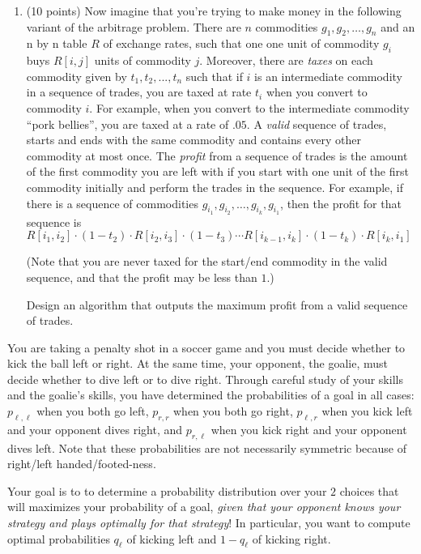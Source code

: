 \documentclass[11pt]{article}
\begin{document}
\begin{enumerate}
\begin{enumerate}
\item (10 points) Now imagine that you're trying to make money in the following variant of the arbitrage problem.  There are $n$ commodities $g_{1}, g_{2}, \ldots, g_{n}$ and an n by n table $R$ of exchange rates, such that one one unit of commodity $g_{i}$ buys $R[i,j]$ units of commodity $j$.  Moreover, there are \emph{taxes} on each commodity given by $t_{1}, t_{2}, ..., t_{n}$ such that if $i$ is an intermediate commodity in a sequence of trades, you are taxed at rate $t_{i}$ when you convert to commodity $i$.  For example, when you convert to the intermediate commodity ``pork bellies'', you are taxed at a rate of $.05$.  A \emph{valid} sequence of trades, starts and ends with the same commodity and contains every other commodity at most once.   The \emph{profit} from a sequence of trades is the amount of the first commodity you are left with if you start with one unit of the first commodity initially and perform the trades in the sequence.  For example, if there is a sequence of commodities $g_{i_{1}}, g_{i_{2}}, \ldots, g_{i_{k}}, g_{i_{1}}$, then the profit for that sequence is\\ $R[i_{1},i_{2}]\cdot (1 - t_{2}) \cdot R[i_{2}, i_{3}] \cdot(1 -  t_{3}) \cdots R[i_{k-1},i_{k}] \cdot (1- t_{k}) \cdot R[i_{k},i_{1}]$

(Note that you are never taxed for the start/end commodity in the valid sequence, and that the profit may be less than $1$.)

Design an algorithm that outputs the maximum profit from a valid sequence of trades.

\end{enumerate}

\extrapage


You are taking a penalty shot in a soccer game and you must decide whether to kick the ball left or right.  At the same time, your opponent, the goalie, must decide whether to dive left or to dive right.  Through careful study of your skills and the goalie's skills, you have determined the probabilities of a goal in all cases: $p_{\ell,\ell}$ when you both go left, $p_{r,r}$ when you both go right, $p_{\ell,r}$ when you kick left and your opponent dives right, and $p_{r,\ell}$ when you kick right and your opponent dives left.  Note that these probabilities are not necessarily symmetric because of right/left handed/footed-ness.

Your goal is to to determine a probability distribution over your $2$ choices that will maximizes your probability of a goal,  \emph{given that your opponent knows your strategy and plays optimally for that strategy}!  In particular, you want to compute optimal probabilities $q_{\ell}$ of kicking left and $1-q_{\ell}$ of kicking right.


\end{enumerate}
\end{document}
